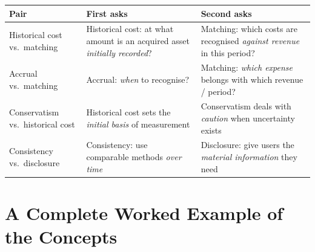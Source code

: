 \documentclass[11pt,a4paper]{article}
\begin{document}
\begin{center}
\small
\begin{tabularx}{\textwidth}{@{}l Y Y@{}}
\toprule
{}\textbf{Pair} & \textbf{First asks} & \textbf{Second asks}\\
\midrule
Historical cost vs.\ matching & Historical cost: at what amount is an acquired asset \emph{initially recorded}? & Matching: which costs are recognised \emph{against revenue} in this period?\\
Accrual vs.\ matching & Accrual: \emph{when} to recognise? & Matching: \emph{which expense} belongs with which revenue / period?\\
Conservatism vs.\ historical cost & Historical cost sets the \emph{initial basis} of measurement & Conservatism deals with \emph{caution} when uncertainty exists\\
Consistency vs.\ disclosure & Consistency: use comparable methods \emph{over time} & Disclosure: give users the \emph{material information} they need\\
\bottomrule
\end{tabularx}
\end{center}

\section{A Complete Worked Example of the Concepts}
\end{document}
